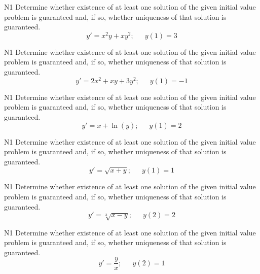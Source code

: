 \begin{problem}{N1}
Determine whether existence of at least one solution of the given initial value problem
is guaranteed and, if so, whether uniqueness of that solution is guaranteed.
\[
y' = x^2y + xy^2; \,\,\,\,\,\,\,\,\,y(1) = 3
\]
\end{problem}

\begin{problem}{N1}
Determine whether existence of at least one solution of the given initial value problem
is guaranteed and, if so, whether uniqueness of that solution is guaranteed.
\[
y' = 2x^2 + xy + 3y^2;\,\,\,\,\,\,\,\,\,y(1) = -1
\]
\end{problem}

\begin{problem}{N1}
Determine whether existence of at least one solution of the given initial value problem
is guaranteed and, if so, whether uniqueness of that solution is guaranteed.
\[
y' = x + \ln(y);\,\,\,\,\,\,\,\,\,y(1) = 2
\]
\end{problem}

\begin{problem}{N1}
Determine whether existence of at least one solution of the given initial value problem
is guaranteed and, if so, whether uniqueness of that solution is guaranteed.
\[
y' = \sqrt{x+y};\,\,\,\,\,\,\,\,\,y(1) = 1
\]
\end{problem}

\begin{problem}{N1}
Determine whether existence of at least one solution of the given initial value problem
is guaranteed and, if so, whether uniqueness of that solution is guaranteed.
\[
y' = \sqrt[3]{x-y};\,\,\,\,\,\,\,\,\,y(2) = 2
\]
\end{problem}

\begin{problem}{N1}
Determine whether existence of at least one solution of the given initial value problem
is guaranteed and, if so, whether uniqueness of that solution is guaranteed.
\[
y' = \frac{y}{x};\,\,\,\,\,\,\,\,\,y(2) = 1
\]
\end{problem}

